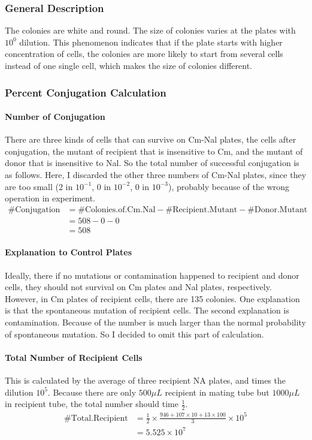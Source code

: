 \documentclass{article}
\begin{document}
			\subsubsection{General Description} 
			The colonies are white and round. The size of colonies varies at the plates with $10 ^ 0$ dilution. This phenomenon indicates that if the plate starts with higher concentration of cells, the colonies are more likely to start from several cells instead of one single cell, which makes the size of colonies different.

			\subsubsection{Percent Conjugation Calculation} 
			\paragraph{Number of Conjugation} There are three kinds of cells that can survive on Cm-Nal plates, the cells after conjugation, the mutant of recipient that is insensitive to Cm, and the mutant of donor that is insensitive to Nal. So the total number of successful conjugation is as follows. Here, I discarded the other three numbers of Cm-Nal plates, since they are too small (2 in $10 ^ {-1}$, 0 in $10^{-2}$, 0 in $10 ^ {-3}$), probably because of the wrong operation in experiment.
			$$
			\begin{aligned}
			\#\text{Conjugation} &= \#\text{Colonies.of.Cm.Nal} - \#\text{Recipient.Mutant} - \#\text{Donor.Mutant}\\
			&= 508 - 0 - 0\\
			&= 508
			\end{aligned}
			$$

			\paragraph{Explanation to Control Plates} Ideally, there if no mutations or contamination happened to recipient and donor cells, they should not survival on Cm plates and Nal plates, respectively. However, in Cm plates of recipient cells, there are 135 colonies. One explanation is that the spontaneous mutation of recipient cells. The second explanation is contamination. Because of the number is much larger than the normal probability of spontaneous mutation. So I decided to omit this part of calculation.

			\paragraph{Total Number of Recipient Cells} This is calculated by the average of three recipient NA plates, and times the dilution $10 ^ {5}$. Because there are only $500 \mu L$ recipient in mating tube but $1000 \mu L$ in recipient tube, the total number should time $\frac{1}{2}$.
			$$
			\begin{aligned}
			\#\text{Total.Recipient} &= \frac{1}{2} \times \frac{946 + 107 \times 10 + 13 \times 100}{3} \times 10 ^{5}\\
			&= 5.525 \times 10 ^ 7
			\end{aligned}
			$$ 
			
\end{document}

